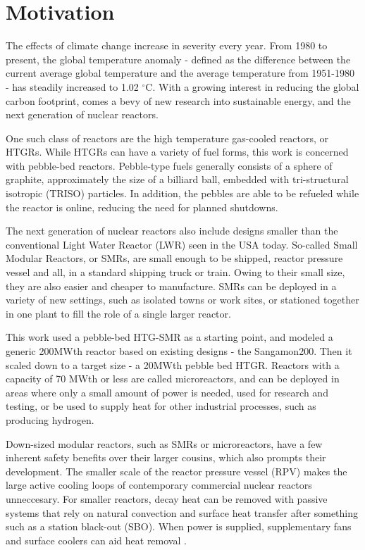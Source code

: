\section{Motivation}

The effects of climate change increase in severity every year. From 1980 to present, the global temperature anomaly - defined as the difference between the current average global temperature and the average temperature from 1951-1980 - has steadily increased to 1.02 $^{\circ}$C.  With a growing interest in reducing the global carbon footprint, comes a bevy of new research into sustainable energy, and the next generation of nuclear reactors.

One such class of reactors are the high temperature gas-cooled reactors, or HTGRs.  While HTGRs can have a variety of fuel forms, this work is concerned with pebble-bed reactors.  Pebble-type fuels generally consists of a sphere of graphite, approximately the size of a billiard ball, embedded with tri-structural isotropic (TRISO) particles.  In addition, the pebbles are able to be refueled while the reactor is online, reducing the need for planned shutdowns.

The next generation of nuclear reactors also include designs smaller than the conventional Light Water Reactor (LWR) seen in the USA today.  So-called Small Modular Reactors, or SMRs, are small enough to be shipped, reactor pressure vessel and all, in a standard shipping truck or train.  Owing to their small size, they are also easier and cheaper to manufacture.  SMRs can be deployed in a variety of new settings, such as isolated towns or work sites, or stationed together in one plant to fill the role of a single larger reactor.

This work used a pebble-bed HTG-SMR as a starting point, and modeled a generic 200MWth reactor based on existing designs - the Sangamon200. Then it scaled down to a target size - a 20MWth pebble bed HTGR.  Reactors with a capacity of 70 MWth or less are called microreactors, and can be deployed in areas where only a small amount of power is needed, used for research and testing, or be used to supply heat for other industrial processes, such as producing hydrogen.

Down-sized modular reactors, such as SMRs or microreactors, have a few inherent safety benefits over their larger cousins, which also prompts their development.  The smaller scale of the reactor pressure vessel (RPV) makes the large active cooling loops of contemporary commercial nuclear reactors unneccesary.  For smaller reactors, decay heat can be removed with passive systems that rely on natural convection and surface heat transfer after something such as a station black-out (SBO).  When power is supplied, supplementary fans and surface coolers can aid heat removal \cite{reutler_advantages_1984}.

